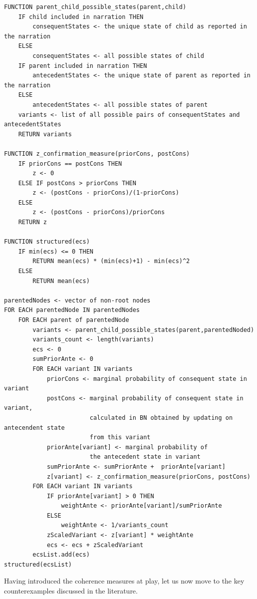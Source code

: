 \documentclass[
  10pt,
]{scrartcl}
\begin{document}
\begin{verbatim}
FUNCTION parent_child_possible_states(parent,child)
    IF child included in narration THEN
        consequentStates <- the unique state of child as reported in the narration
    ELSE
        consequentStates <- all possible states of child
    IF parent included in narration THEN
        antecedentStates <- the unique state of parent as reported in the narration
    ELSE
        antecedentStates <- all possible states of parent
    variants <- list of all possible pairs of consequentStates and antecedentStates
    RETURN variants

FUNCTION z_confirmation_measure(priorCons, postCons)
    IF priorCons == postCons THEN
        z <- 0
    ELSE IF postCons > priorCons THEN
        z <- (postCons - priorCons)/(1-priorCons)
    ELSE
        z <- (postCons - priorCons)/priorCons
    RETURN z

FUNCTION structured(ecs)
    IF min(ecs) <= 0 THEN
        RETURN mean(ecs) * (min(ecs)+1) - min(ecs)^2
    ELSE
        RETURN mean(ecs)

parentedNodes <- vector of non-root nodes
FOR EACH parentedNode IN parentedNodes
    FOR EACH parent of parentedNode
        variants <- parent_child_possible_states(parent,parentedNoded)
        variants_count <- length(variants)
        ecs <- 0
        sumPriorAnte <- 0
        FOR EACH variant IN variants
            priorCons <- marginal probability of consequent state in variant
            postCons <- marginal probability of consequent state in variant, 
                        calculated in BN obtained by updating on antecendent state
                        from this variant
            priorAnte[variant] <- marginal probability of 
                        the antecedent state in variant
            sumPriorAnte <- sumPriorAnte +  priorAnte[variant]
            z[variant] <- z_confirmation_measure(priorCons, postCons)
        FOR EACH variant IN variants
            IF priorAnte[variant] > 0 THEN
                weightAnte <- priorAnte[variant]/sumPriorAnte
            ELSE
                weightAnte <- 1/variants_count
            zScaledVariant <- z[variant] * weightAnte
            ecs <- ecs + zScaledVariant
        ecsList.add(ecs)
structured(ecsList)
\end{verbatim}

\normalsize


\noindent Having introduced the coherence measures at play, let us now move to the key counterexamples discussed in the literature.
\end{document}
